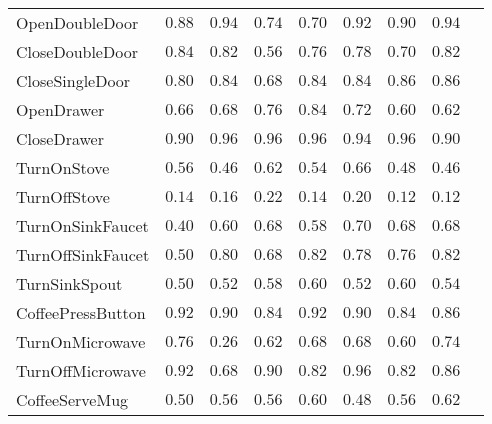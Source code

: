 \begin{table*}[t!]
\begin{center}
\begin{sc}
{\begin{tabular}{l|cccccccc}
OpenDoubleDoor
& $0.88$
& $0.94$
& $0.74$
& $0.70$
& $0.92$
& $0.90$
& $0.94$
\\
CloseDoubleDoor
& $0.84$
& $0.82$
& $0.56$
& $0.76$
& $0.78$
& $0.70$
& $0.82$
\\
CloseSingleDoor
& $0.80$
& $0.84$
& $0.68$
& $0.84$
& $0.84$
& $0.86$
& $0.86$
\\
\midrule
OpenDrawer
& $0.66$
& $0.68$
& $0.76$
& $0.84$
& $0.72$
& $0.60$
& $0.62$
\\

CloseDrawer
& $0.90$
& $0.96$
& $0.96$
& $0.96$
& $0.94$
& $0.96$
& $0.90$
\\
\midrule
TurnOnStove
& $0.56$
& $0.46$
& $0.62$
& $0.54$
& $0.66$
& $0.48$
& $0.46$
\\

TurnOffStove
& $0.14$
& $0.16$
& $0.22$
& $0.14$
& $0.20$
& $0.12$
& $0.12$
\\
\midrule
TurnOnSinkFaucet
& $0.40$
& $0.60$
& $0.68$
& $0.58$
& $0.70$
& $0.68$
& $0.68$
\\

TurnOffSinkFaucet
& $0.50$
& $0.80$
& $0.68$
& $0.82$
& $0.78$
& $0.76$
& $0.82$
\\

TurnSinkSpout
& $0.50$
& $0.52$
& $0.58$
& $0.60$
& $0.52$
& $0.60$
& $0.54$
\\
\midrule
CoffeePressButton
& $0.92$
& $0.90$
& $0.84$
& $0.92$
& $0.90$
& $0.84$
& $0.86$
\\

TurnOnMicrowave
& $0.76$
& $0.26$
& $0.62$
& $0.68$
& $0.68$
& $0.60$
& $0.74$
\\

TurnOffMicrowave
& $0.92$
& $0.68$
& $0.90$
& $0.82$
& $0.96$
& $0.82$
& $0.86$
\\
\midrule
CoffeeServeMug
& $0.50$
& $0.56$
& $0.56$
& $0.60$
& $0.48$
& $0.56$
& $0.62$
\\


\end{tabular}}
\end{sc}
\end{center}
\end{table*}
